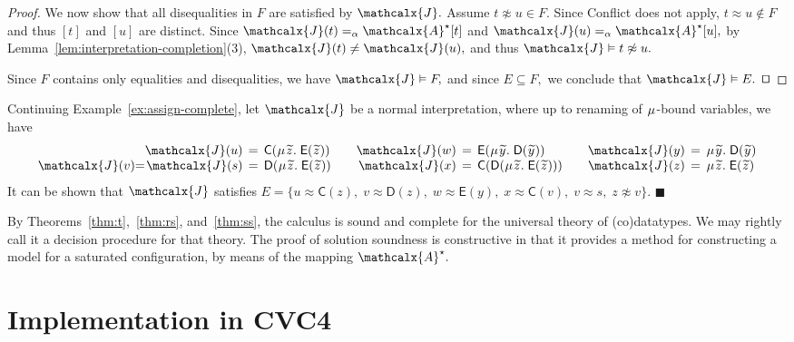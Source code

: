\documentclass[smallcondensed,draft]{svjour3}
\newcommand\MU{\vvthinspace\mu\vvthinspace}
\newcommand\const[1]{\textsf{#1}}
\newcommand\xend{{\hfill$\scriptstyle\blacksquare$}}
\newcommand\xqed{{\hfill$\scriptstyle\squareforqed$}}
\newcommand{\Ec}{E}
\newcommand{\Fc}{F}
\newcommand{\rn}[1]{\textsf{#1}}
\newcommand{\teq}{\approx}
\newcommand{\tneq}{\not\teq}
\newcommand{\interp}[2]{#1(#2)}
\newcommand{\ec}[1]{[#1]}
\newcommand{\J}{\mathcalx{J}}
\newcommand{\ValC}{\smash{\mathcalx{A}^\star}}
\newcommand{\Varec}[1]{\vvthinspace\widetilde{#1}\vvthinspace}
\newcommand{\aequiv}{\mathrel{=_\alpha}}
\newcommand{\vsim}{\aequiv}
\newcommand\vvthinspace{\kern+0.041667em}
\begin{document}
\begin{proof}
We now show that all disequalities in $\Fc$ are satisfied by $\J.$
Assume $t \tneq u \in \Fc\!.$
Since \rn{Conflict} does not apply, $t \teq u \notin \Fc$ and thus $\ec{t}$ and $\ec{u}$ are distinct.
Since $\interp{\J}{t} \vsim \ValC \ec{t}$ and $\interp{\J}{u} \vsim \ValC \ec{u},$
by Lemma~\ref{lem:interpretation-completion}(3), $\interp{\J}{t} \neq \interp{\J}{u},$ and thus $\J \vDash t \tneq u.$

Since $\Fc$ contains only equalities and disequalities, we have $\J \vDash \Fc\!,$
and since $\Ec \subseteq \Fc\!,$
we conclude that $\J \vDash \Ec.$
\xqed
\end{proof}

\begin{examplex}
\label{ex:model}
Continuing Example~\ref{ex:assign-complete}, let $\J$ be a normal interpretation, where
up to renaming of $\MU$-bound variables, we have
\[\begin{array}{r@{}c@{}r@{}c@{}l@{\qquad}r@{}c@{}l@{\qquad}r@{}c@{}l}
& &\interp{\J}{u} & {}\,=\,{} &  \const{C}( \MU {\Varec{z}}.\; \const{E}( {\Varec{z}} ) ) &
\interp{\J}{w} & = &  \const{E}( \MU {\Varec{y}}.\; \const{D}( {\Varec{y}} ) ) &
\interp{\J}{y} & {}\,=\,{} & \MU {\Varec{y}}.\; \const{D}( {\Varec{y}} ) \\
\interp{\J}{v} & = & \interp{\J}{s} & = & \const{D}( \MU {\Varec{z}}.\; \const{E}( {\Varec{z}} ) ) &
\interp{\J}{x} & {}\,=\,{} & \const{C}( \const{D}( \MU {\Varec{z}}.\; \const{E}( {\Varec{z}} ) ) ) &
\interp{\J}{z} & = & \MU {\Varec{z}}.\; \const{E}( {\Varec{z}} )
\end{array}\]
It can be shown that $\J$ satisfies $\Ec =
\{
u \teq \const{C}( z ),\;
v \teq \const{D}( z ),\;
w \teq \const{E}( y ),\;
x \teq \const{C}( v ),\;
v \teq s,\;
z \not\teq v
\}.$
\xend
\end{examplex}

By Theorems~\ref{thm:t},~\ref{thm:rs}, and~\ref{thm:ss}, the
calculus is sound and complete for the universal theory of (co)datatypes. We may
rightly call it a decision procedure for that theory.
The proof of solution soundness is constructive in that it provides a
method for constructing a model for a saturated configuration, by means of the
mapping $\ValC.$

\section{Implementation in CVC4}
\label{sec:implementation-as-a-theory-solver-in-cvc4}
\end{document}
